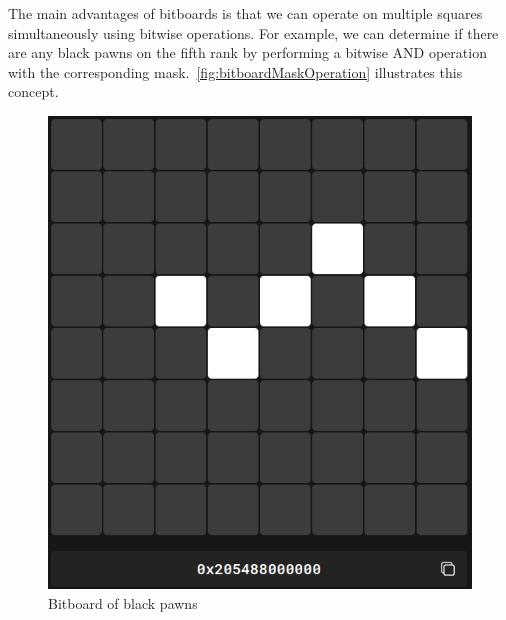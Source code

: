 \noindent The main advantages of bitboards is that we can operate on multiple squares simultaneously using bitwise operations. For example, we can determine if there are any black pawns on the fifth rank by performing a bitwise AND operation with the corresponding mask.~\cref{fig:bitboardMaskOperation} illustrates this concept.

\begin{figure}[H]
    \centering
    \begin{minipage}[c]{0.30\textwidth}
        \centering
        \includegraphics[width=\textwidth]{Imagenes/bitboard_black_pawns.png}
        \caption*{Bitboard of black pawns}
    \end{minipage}
    \hfill
    \begin{minipage}[c]{0.30\textwidth}
        \centering

\end{minipage}
\end{figure}
